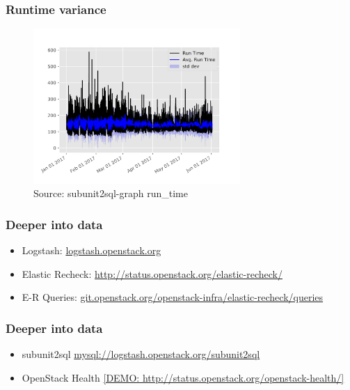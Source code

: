 \documentclass[aspectratio=169,11pt,hyperref={colorlinks=true}]{beamer}
\begin{document}
\begin{frame}
    \frametitle{Runtime variance}
    \begin{figure}
    \begin{center}
    	\includegraphics[width=0.7\textwidth]{runtime_variance.png}
         \caption{Source: subunit2sql-graph run\_time}
    \end{center}
    \end{figure}
\end{frame}


\begin{frame}
    \frametitle{Deeper into data}
    \begin{itemize}
        \item{Logstash: \href{http://logstash.openstack.org}{logstash.openstack.org}}
        \item{Elastic Recheck: \href{http://status.openstack.org/elastic-recheck/}{http://status.openstack.org/elastic-recheck/}}
        \item{E-R Queries: \href{http://git.openstack.org/cgit/openstack-infra/elastic-recheck/tree/queries}{git.openstack.org/openstack-infra/elastic-recheck/queries}}
    \end{itemize}
\end{frame}


\begin{frame}
    \frametitle{Deeper into data}
    \begin{itemize}
        \item{subunit2sql \href{mysql://query:query@logstash.openstack.org/subunit2sql}{mysql://logstash.openstack.org/subunit2sql}}
        \item{OpenStack Health \href{http://status.openstack.org/openstack-health/\#/}{[DEMO: http://status.openstack.org/openstack-health/]}}
    \end{itemize}
\end{frame}
\end{document}

